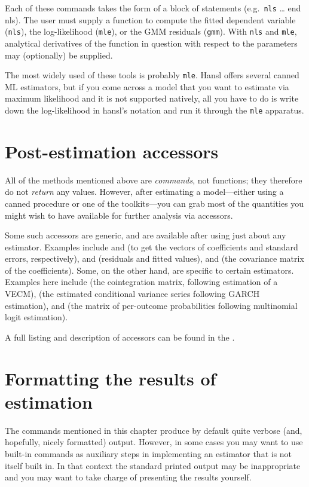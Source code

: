 Each of these commands takes the form of a block of statements (e.g.\
\texttt{nls} \dots{} \textrm{end nls}). The user must supply a
function to compute the fitted dependent variable (\texttt{nls}), the
log-likelihood (\texttt{mle}), or the GMM residuals
(\texttt{gmm}). With \texttt{nls} and \texttt{mle}, analytical
derivatives of the function in question with respect to the parameters
may (optionally) be supplied.

The most widely used of these tools is probably \texttt{mle}. Hansl
offers several canned ML estimators, but if you come across a model
that you want to estimate via maximum likelihood and it is not
supported natively, all you have to do is write down the
log-likelihood in hansl's notation and run it through the \texttt{mle}
apparatus.

\section{Post-estimation accessors}
\label{sec:postest-accessors}

All of the methods mentioned above are \textit{commands}, not
functions; they therefore do not \textit{return} any values. However,
after estimating a model---either using a canned procedure or one of
the toolkits---you can grab most of the quantities you might wish to
have available for further analysis via accessors.

Some such accessors are generic, and are available after using just
about any estimator. Examples include \dollar{coeff} and
 (to get the vectors of coefficients and standard
errors, respectively), \dollar{uhat} and \dollar{yhat} (residuals and
fitted values), and \dollar{vcv} (the covariance matrix of the
coefficients). Some, on the other hand, are specific to certain
estimators. Examples here include  (the cointegration
matrix, following estimation of a VECM), \dollar{h} (the estimated
conditional variance series following GARCH estimation), and
 (the matrix of per-outcome probabilities following
multinomial logit estimation).

A full listing and description of accessors can be found in the
\GCR.

\section{Formatting the results of estimation}

The commands mentioned in this chapter produce by default quite
verbose (and, hopefully, nicely formatted) output. However, in some
cases you may want to use built-in commands as auxiliary steps in
implementing an estimator that is not itself built in. In that context
the standard printed output may be inappropriate and you may want to
take charge of presenting the results yourself. 

